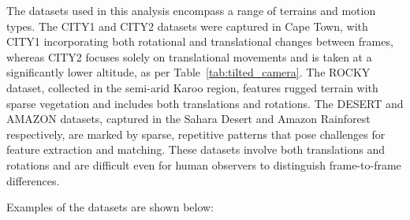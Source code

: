 The datasets used in this analysis encompass a range of terrains and motion types. The CITY1 and CITY2 datasets were captured in Cape Town, with CITY1 incorporating both rotational and translational changes between frames, whereas CITY2 focuses solely on translational movements and is taken at a significantly lower altitude, as per Table~\ref{tab:tilted_camera}. The ROCKY dataset, collected in the semi-arid Karoo region, features rugged terrain with sparse vegetation and includes both translations and rotations. The DESERT and AMAZON datasets, captured in the Sahara Desert and Amazon Rainforest respectively, are marked by sparse, repetitive patterns that pose challenges for feature extraction and matching. These datasets involve both translations and rotations and are difficult even for human observers to distinguish frame-to-frame differences.



Examples of the datasets are shown below:

